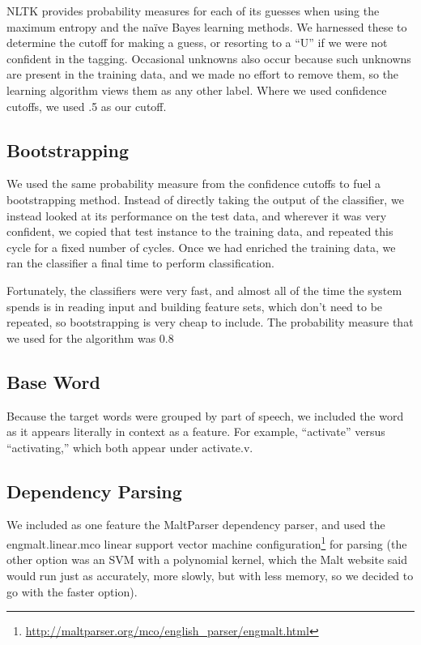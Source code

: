 \documentclass{article}
\newcommand{\naive}{na\"ive}
\begin{document}
NLTK provides probability measures for each of its guesses when using the
maximum entropy and the \naive{} Bayes learning methods.  We harnessed these to
determine the cutoff for making a guess, or resorting to a ``U'' if we were not
confident in the tagging.  Occasional unknowns also occur because such unknowns
are present in the training data, and we made no effort to remove them, so the
learning algorithm views them as any other label.  Where we used confidence
cutoffs, we used .5 as our cutoff.


\subsection{Bootstrapping}

We used the same probability measure from the confidence cutoffs to fuel a
bootstrapping method.  Instead of directly taking the output of the classifier,
we instead looked at its performance on the test data, and wherever it was very
confident, we copied that test instance to the training data, and repeated this
cycle for a fixed number of cycles.  Once we had enriched the training data, we
ran the classifier a final time to perform classification.

Fortunately, the classifiers were very fast, and almost all of the time the
system spends is in reading input and building feature sets, which don't need
to be repeated, so bootstrapping is very cheap to include.  The probability measure that we used for the algorithm was 0.8



\subsection{Base Word}

Because the target words were grouped by part of speech, we included the word
as it appears literally in context as a feature.  For example, ``activate''
versus ``activating,'' which both appear under activate.v.

\subsection{Dependency Parsing}

We included as one feature the MaltParser dependency parser, and used the
engmalt.linear.mco linear support vector machine
configuration\footnote{\url{http://maltparser.org/mco/english_parser/engmalt.html}}
for parsing (the other option was an SVM with a polynomial kernel, which the
Malt website said would run just as accurately, more slowly, but with less
memory, so we decided to go with the faster option).
\end{document}
